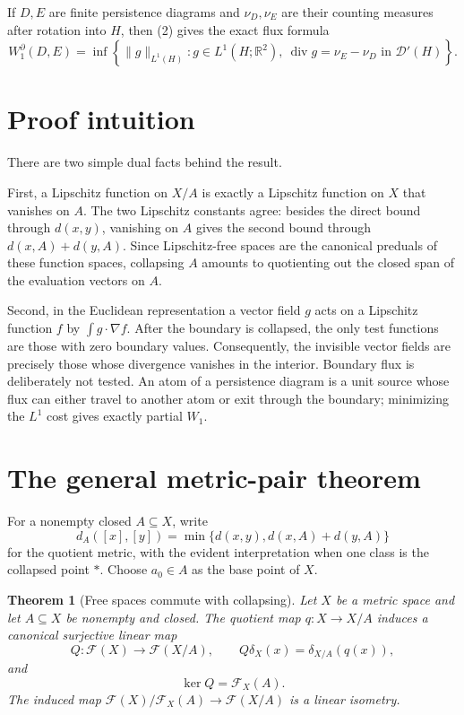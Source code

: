 \documentclass[11pt]{article}
\newtheorem{theorem}{Theorem}
\newcommand{\F}{\mathcal F}
\newcommand{\R}{\mathbb R}
\newcommand{\D}{\mathcal D}
\newcommand{\diver}{\operatorname{div}}
\begin{document}
If $D,E$ are finite persistence diagrams and $\nu_D,\nu_E$ are their counting
measures after rotation into $H$, then (2) gives the exact flux formula
\[
 \boxed{
 W_1^\partial(D,E)
 =\inf\left\{\|g\|_{L^1(H)}:
       g\in L^1(H;\R^2),\ \diver g=\nu_E-\nu_D\text{ in }\D'(H)
       \right\}.}                                             \tag{3}
\]

\section*{Proof intuition}

There are two simple dual facts behind the result.

First, a Lipschitz function on $X/A$ is exactly a Lipschitz function on $X$
that vanishes on $A$.  The two Lipschitz constants agree: besides the direct
bound through $d(x,y)$, vanishing on $A$ gives the second bound through
$d(x,A)+d(y,A)$.  Since Lipschitz-free spaces are the canonical preduals of
these function spaces, collapsing $A$ amounts to quotienting out the closed
span of the evaluation vectors on $A$.

Second, in the Euclidean representation a vector field $g$ acts on a
Lipschitz function $f$ by $\int g\cdot\nabla f$.  After the boundary is
collapsed, the only test functions are those with zero boundary values.
Consequently, the invisible vector fields are precisely those whose
divergence vanishes in the interior.  Boundary flux is deliberately not
tested.  An atom of a persistence diagram is a unit source whose flux can
either travel to another atom or exit through the boundary; minimizing the
$L^1$ cost gives exactly partial $W_1$.

\section*{The general metric-pair theorem}

For a nonempty closed $A\subseteq X$, write
\[
 d_A([x],[y])=\min\{d(x,y),d(x,A)+d(y,A)\}
\]
for the quotient metric, with the evident interpretation when one class is
the collapsed point $*$.  Choose $a_0\in A$ as the base point of $X$.

\begin{theorem}[Free spaces commute with collapsing]\label{thm:collapse}
Let $X$ be a metric space and let $A\subseteq X$ be nonempty and closed.
The quotient map $q:X\to X/A$ induces a canonical surjective linear map
\[
 Q:\F(X)\longrightarrow \F(X/A),\qquad Q\delta_X(x)=\delta_{X/A}(q(x)),
\]
and
\[
 \ker Q=\F_X(A).
\]
The induced map $\F(X)/\F_X(A)\to\F(X/A)$ is a linear isometry.
\end{theorem}
\end{document}
